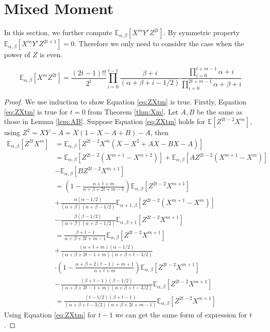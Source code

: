 \documentclass[twoside]{article}%
\def\E{\mathbb{E}}
\begin{document}
\section{Mixed Moment}
In this section, we further compute $\E_{\alpha,\beta}[X^mY^rZ^{2t}]$.
By symmetric property  $\E_{\alpha,\beta}[X^mY^rZ^{2t+1}] = 0$.
Therefore we only need to consider the case when the power of $Z$
is even.
\begin{theorem}\label{thm:mm}
\begin{equation}\label{eq:ZXtm}
\E_{\alpha, \beta}[X^mZ^{2t}] = \frac{(2t-1)!!}{2^t}
\prod_{i=0}^{t-1}
\frac{\beta+i}{(\alpha+\beta+i-1/2)}
\frac{\prod_{i=0}^{t+m-1}\alpha+i}{\prod_{i=0}^{2t+m-1}
\alpha+\beta+i}
\end{equation}
\end{theorem}
\begin{proof}
We use induction to show Equation \eqref{eq:ZXtm} is true.
Firstly, Equation \eqref{eq:ZXtm} is true for $t=0$ from 
Theorem \ref{thm:Xm}. Let $A, B$ be the same as those
in Lemma \ref{lem:AB}.
Suppose Equation \eqref{eq:ZXtm} holds for $\E[Z^{2t-2}X^m]$,
using $Z^2=XY-A=X(1-X-A+B)-A$, then
\begin{align*}
\E_{\alpha,\beta}[Z^{2t}X^m] &=
\E_{\alpha,\beta}[Z^{2t-2}X^m(X-X^2+AX-BX-A)] \\
&= \E_{\alpha,\beta}[Z^{2t-2}(X^{m+1} - X^{m+2})] +
\E_{\alpha,\beta}[A Z^{2t-2} (X^{m+1} - X^m)] \\
&-
\E_{\alpha,\beta}[BZ^{2t-2} X^{m+1}] \\
&= \left(1-\frac{\alpha+t+m}{\alpha+\beta+2t+m-1}
\right)\E_{\alpha, \beta}[Z^{2t-2}X^{m+1}] \\
&+
\frac{\alpha(\alpha-1/2)}{(\alpha+\beta)(\alpha+\beta-1/2)}
\E_{\alpha+1,\beta}[Z^{2t-2}(X^{m+1} - X^m)] \\
&-\frac{\beta(\beta-1/2)}{(\alpha+\beta)(\alpha+\beta-1/2)}
\E_{\alpha,\beta+1}[Z^{2t-2}X^{m+1}]\\
&=\frac{\beta+t-1}{\alpha+\beta + 2t+m-1}
\E_{\alpha,\beta}[Z^{2t-2}X^{m+1}] \\
&+\frac{(\alpha+t+m)(\alpha-1/2)}{(\alpha+\beta+2t-1+m)(\alpha+\beta + t - 3/2)}\\
&\cdot
\left(1-\frac{\alpha+\beta+2(t-1)+m+1}{\alpha+t+m}\right)
\E_{\alpha, \beta}[Z^{2t-2}X^{m+1}] \\
&-\frac{(\beta+t-1)(\beta-1/2)}{(\alpha+\beta+2t-1+m)(\alpha+\beta + t - 3/2)}
\E_{\alpha,\beta}[Z^{2t-2}X^{m+1}]\\
&=\frac{(t-1/2)(\beta+t-1)}{(\alpha+\beta+t-3/2)(\alpha+\beta+2t+m-1)}
\E_{\alpha, \beta}[Z^{2t-2}X^{m+1}]
\end{align*}
Using Equation \eqref{eq:ZXtm} for $t-1$
we can get the same form of expression for $t$.
\end{proof}
\end{document}
